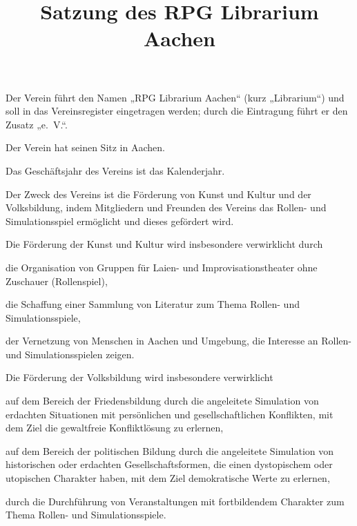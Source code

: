 



\title{Satzung des RPG Librarium Aachen}
\maketitle

\begin{contract}
	
Der Verein führt den Namen „RPG Librarium Aachen“ (kurz „Librarium“) und soll in das Vereinsregister eingetragen werden; durch die Eintragung führt er den Zusatz „e.~V.“.
       
Der Verein hat seinen Sitz in Aachen.
       
Das Geschäftsjahr des Vereins ist das Kalenderjahr.
	
Der Zweck des Vereins ist die Förderung von Kunst und Kultur und der Volksbildung, indem Mitgliedern und Freunden des Vereins das Rollen- und Simulationsspiel ermöglicht und dieses gefördert wird.
       
Die Förderung der Kunst und Kultur wird insbesondere verwirklicht durch
       \begin{subpara}
       	\item die Organisation von Gruppen für Laien- und Improvisationstheater ohne Zuschauer (Rollenspiel),
       	\item die Schaffung einer Sammlung von Literatur zum Thema Rollen- und Simulationsspiele,
       	\item der Vernetzung von Menschen in Aachen und Umgebung, die Interesse an Rollen- und Simulationsspielen zeigen.
       \end{subpara}
       
Die Förderung der Volksbildung wird insbesondere verwirklicht 
	\begin{subpara}
		\item auf dem Bereich der Friedensbildung durch die angeleitete Simulation von erdachten Situationen mit persönlichen und gesellschaftlichen Konflikten, mit dem Ziel die gewaltfreie Konfliktlösung zu erlernen,
		\item auf dem Bereich der politischen Bildung durch die angeleitete Simulation von historischen oder erdachten Gesellschaftsformen, die einen dystopischem oder utopischen Charakter haben, mit dem Ziel demokratische Werte zu erlernen,
		\item durch die Durchführung von Veranstaltungen mit fortbildendem Charakter zum Thema Rollen- und Simulationsspiele.
	\end{subpara}
	

\end{contract}
